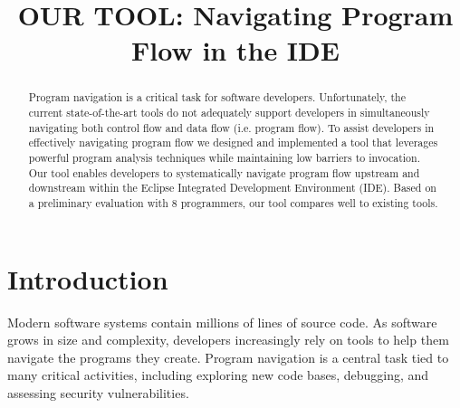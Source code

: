 \documentclass[conference]{IEEEtran}
\newcommand{\toolName}{OUR TOOL}
\begin{document}
%
\title{\toolName: Navigating Program Flow in the IDE}


\author{
}

\maketitle

\begin{abstract}
Program navigation is a critical task for software developers. 
Unfortunately, the current state-of-the-art tools do not adequately support developers in simultaneously navigating both control flow and data flow (i.e. program flow). 
To assist developers in effectively navigating program flow we designed and implemented a tool that leverages powerful program analysis techniques while maintaining low barriers to invocation.
Our tool enables developers to systematically navigate program flow upstream and downstream within the Eclipse Integrated Development Environment (IDE).
Based on a preliminary evaluation with 8 programmers, our tool compares well to existing tools. 
\end{abstract}




\IEEEpeerreviewmaketitle


\section{Introduction}
%
Modern software systems contain millions of lines of source code. 
As software grows in size and complexity, developers increasingly rely on tools to help them navigate the programs they create. 
Program navigation is a central task tied to many critical activities, including exploring new code bases, debugging, and assessing security vulnerabilities. 
\end{document}
